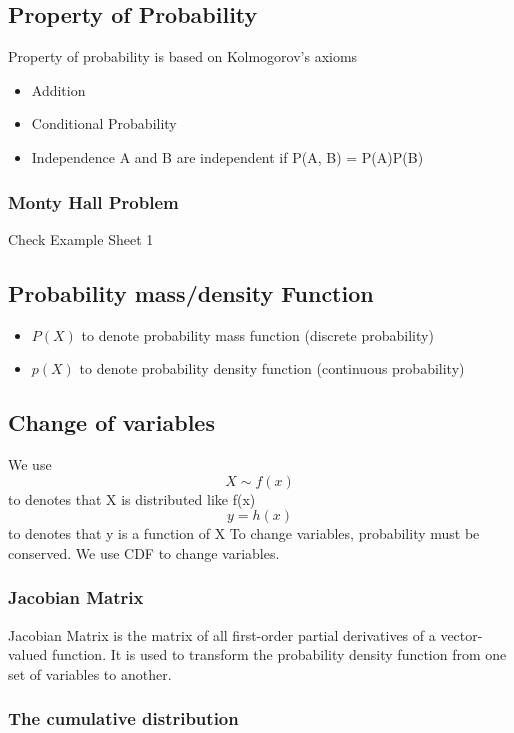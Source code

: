 \documentclass[12pt,a4paper]{article}
\begin{document}
\subsection{Property of Probability}
    Property of probability is based on Kolmogorov's axioms
    \begin{itemize}
        \item Addition
        \item Conditional Probability
        \item Independence
            A and B are independent if P(A, B) = P(A)P(B)

    \end{itemize}
    \subsubsection{Monty Hall Problem}
    Check Example Sheet 1

\subsection{Probability mass/density Function}
\begin{itemize}
    \item $P(X)$ to denote probability mass function (discrete probability)
    \item $p(X)$ to denote probability density function (continuous probability)
\end{itemize}
    


\subsection{Change of variables}
    We use 
    $$X \sim f(x)$$
    to denotes that X is distributed like f(x)
    $$y = h(x)$$
    to denotes that y is a function of X
    To change variables, probability must be conserved. We use CDF to change variables.

\subsubsection{Jacobian Matrix}
    Jacobian Matrix is the matrix of all first-order partial derivatives of a vector-valued function. It is used to transform the probability density function from one set of variables to another.

\subsubsection{The cumulative distribution}
\end{document}
